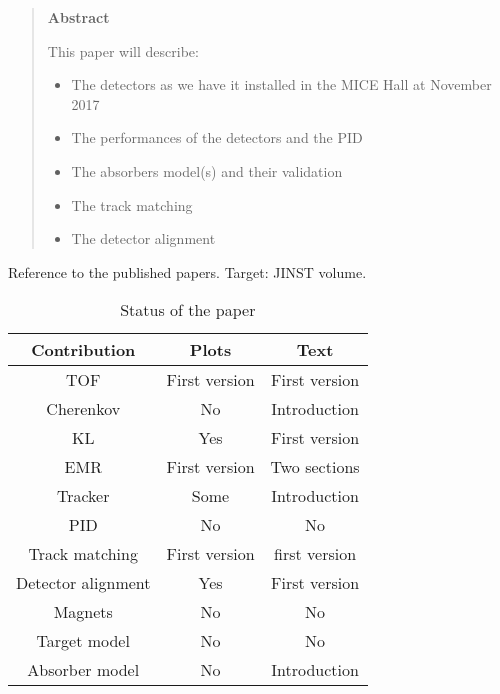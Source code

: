 \begin{quotation}
\begin{center}
\textbf{Abstract}
\end{center}
  \noindent
  This paper will describe:
  \begin{itemize}
    \item The detectors as we have it installed in the MICE Hall at November 2017
    \item The performances of the detectors and the PID
    \item The absorbers model(s) and their validation
    \item The track matching
    \item The detector alignment
  \end{itemize}
\end{quotation}

\noindent

Reference to the published papers.
Target: JINST volume.

\begin{table}[!ht]
  \caption{Status of the paper}
  \label{tab:}

  \begin{center}
    \begin{tabular}{c|c|c}
        \hline
       Contribution         & Plots             & Text\\
       \hline
       TOF                  & First version     & First version \\
       Cherenkov            & No                & Introduction \\
       KL                   & Yes               & First version \\
       EMR                  & First version     & Two sections \\
       Tracker              & Some              & Introduction \\
       PID                  & No                & No \\
       Track matching       & First version     & first version \\
       Detector alignment   & Yes               & First version \\
       Magnets              & No                & No \\
       Target model         & No                & No \\
       Absorber model       & No                & Introduction \\
       
       \hline
    \end{tabular}
  \end{center}
\end{table}
